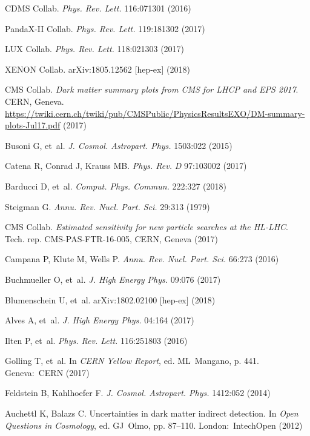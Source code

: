 \documentclass{ar-1col}
\begin{document}
{\begin{thebibliography}{175}
CDMS Collab. \textit{Phys. Rev. Lett.} 116:071301 (2016)

PandaX-II Collab. \textit{Phys. Rev. Lett.} 119:181302 (2017)

LUX Collab. \textit{Phys. Rev. Lett.} 118:021303 (2017)

XENON Collab. arXiv:1805.12562 [hep-ex] (2018)

CMS Collab. \textit{Dark \MakeLowercase{Matter Summary Plots} from CMS for LHCP and EPS 2017}. CERN, Geneva. \url{https://twiki.cern.ch/twiki/pub/CMSPublic/PhysicsResultsEXO/DM-summary-plots-Jul17.pdf} (2017)

Busoni G, et~al. \textit{J. Cosmol. Astropart. Phys.} 1503:022 (2015)

Catena R, Conrad J, Krauss MB. \textit{Phys. Rev.} \textit{D} 97:103002 (2017)

Barducci D, et~al. \textit{Comput. Phys. Commun.} 222:327 (2018)

Steigman G. \textit{Annu. Rev. Nucl. Part. Sci.} 29:313 (1979)
  
{CMS Collab}. \textit{Estimated sensitivity for new particle searches at the HL-LHC}.
Tech. rep. CMS-PAS-FTR-16-005, CERN, Geneva (2017)

Campana P, Klute M, Wells P. \textit{Annu. Rev. Nucl. Part. Sci.}
66:273 (2016)

Buchmueller O, et~al. \textit{J. High Energy Phys.} 09:076 (2017)

Blumenschein U, et~al. arXiv:1802.02100 [hep-ex] (2018)


Alves A, et~al. \textit{J. High Energy Phys.} 04:164 (2017)

Ilten P, et~al. \textit{Phys. Rev. Lett.} 116:251803 (2016)

Golling T, et~al. In \textit{CERN Yellow Report}, ed. ML\ Mangano, p. 441. Geneva:\ CERN (2017)

Feldstein B, Kahlhoefer F. \textit{J. Cosmol. Astropart. Phys.} 1412:052 (2014)

Auchettl K, Balazs C. {Uncertainties in dark matter indirect detection}. In \textit{Open Questions in Cosmology}, ed. GJ\ Olmo, pp. 87--110. London:\ IntechOpen (2012)


\end{thebibliography}}
\end{document}
